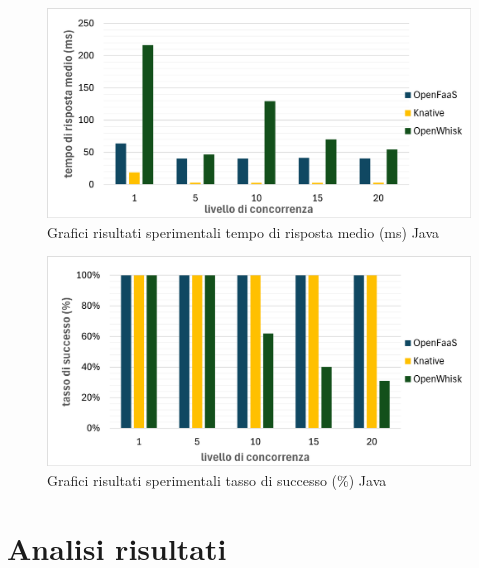 \documentclass[12pt,a4paper,openany,twoside]{book}
\begin{document}
\begin{figure}[ht]
    \centering
    \includegraphics[width=0.95\linewidth]{figures/graphs/tempoRisposta_java.pdf}
    \caption{Grafici risultati sperimentali tempo di risposta medio (ms) Java}
    \label{fig:grafici-tempo-risposta-java}
\end{figure}
    
\begin{figure}[ht]
    \centering
    \includegraphics[width=0.95\linewidth]{figures/graphs/tassoSuccesso_java.pdf}
    \caption{Grafici risultati sperimentali tasso di successo (\%) Java}
    \label{fig:grafici-tasso-successo-java}
\end{figure}


\section{Analisi risultati}
\end{document}
